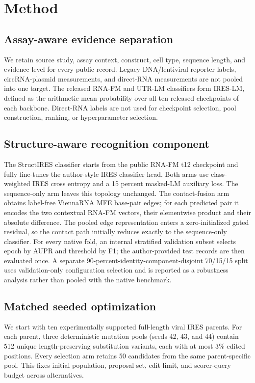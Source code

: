 \section{Method}

\subsection{Assay-aware evidence separation}
We retain source study, assay context, construct, cell type, sequence length,
and evidence level for every public record. Legacy DNA/lentiviral reporter
labels, circRNA-plasmid measurements, and direct-RNA measurements are not
pooled into one target. The released RNA-FM and UTR-LM classifiers form
IRES-LM, defined as the arithmetic mean probability over all ten released
checkpoints of each backbone. Direct-RNA labels are not used for checkpoint
selection, pool construction, ranking, or hyperparameter selection.

\subsection{Structure-aware recognition component}
The StructIRES classifier starts from the public RNA-FM t12 checkpoint and
fully fine-tunes the author-style IRES classifier head. Both arms use
class-weighted IRES cross entropy and a 15 percent masked-LM auxiliary loss.
The sequence-only arm leaves this topology unchanged. The contact-fusion arm
obtains label-free ViennaRNA MFE base-pair edges; for each predicted pair it
encodes the two contextual RNA-FM vectors, their elementwise product and their
absolute difference. The pooled edge representation enters a zero-initialized
gated residual, so the contact path initially reduces exactly to the
sequence-only classifier. For every native fold, an internal stratified
validation subset selects epoch by AUPR and threshold by F1; the
author-provided test records are then evaluated once. A separate
90-percent-identity-component-disjoint 70/15/15 split uses validation-only
configuration selection and is reported as a robustness analysis rather than
pooled with the native benchmark.

\subsection{Matched seeded optimization}
We start with ten experimentally supported full-length viral IRES parents.
For each parent, three deterministic mutation pools (seeds 42, 43, and 44)
contain 512 unique length-preserving substitution variants, each with at most
3\% edited positions. Every selection arm retains 50 candidates from the
same parent-specific pool. This fixes initial population, proposal set, edit
limit, and scorer-query budget across alternatives.

